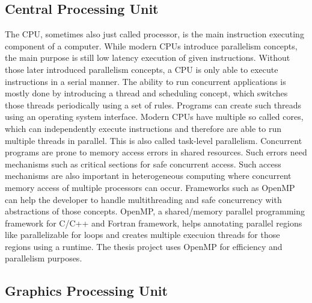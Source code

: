 \subsection{Central Processing Unit}
The \acrshort{CPU}, sometimes also just called processor, is the main instruction executing component of a computer. While modern \acrshort{CPU}s introduce parallelism concepts, the main purpose is still low latency execution of given instructions.
Without those later introduced parallelism concepts, a \acrshort{CPU} is only able to execute instructions in a serial manner. The ability to run concurrent applications is mostly done by introducing a thread and scheduling concept, which switches those threads periodically using a set of rules. Programs can create such threads using an operating system interface.
Modern \acrshort{CPU}s have multiple so called cores, which can independently execute instructions and therefore are able to run multiple threads in parallel. This is also called task-level parallelism.
Concurrent programs are prone to memory access errors in shared resources. Such errors need mechanisms such as critical sections for safe concurrent access. Such access mechanisms are also important in heterogeneous computing where concurrent memory access of multiple processors can occur.
Frameworks such as OpenMP can help the developer to handle multithreading and safe concurrency with abstractions of those concepts. OpenMP, a shared/memory parallel programming framework for C/C++ and Fortran framework, helps annotating parallel regions like parallelizable for loops and creates multiple execuion threads for those regions using a runtime.
The thesis project uses OpenMP for efficiency and parallelism purposes.

\subsection{Graphics Processing Unit}


